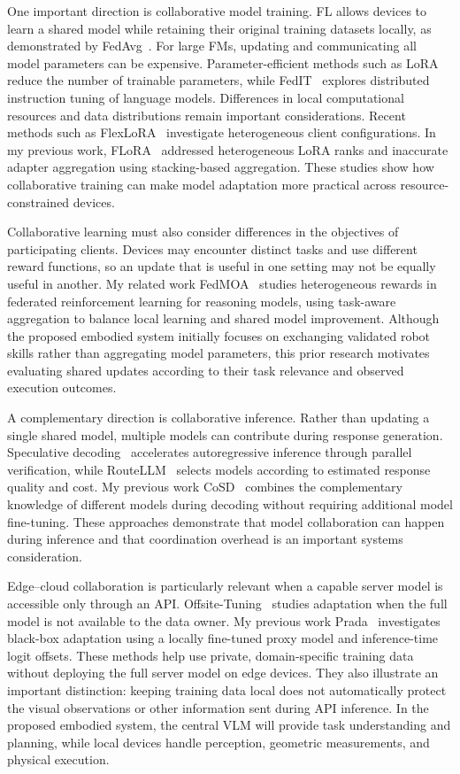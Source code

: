 \documentclass[11pt]{article}
\begin{document}
One important direction is collaborative model training. FL allows devices to learn a shared model while retaining their original training datasets locally, as demonstrated by FedAvg~\cite{mcmahan2017fedavg}. For large FMs, updating and communicating all model parameters can be expensive. Parameter-efficient methods such as LoRA~\cite{hu2022lora} reduce the number of trainable parameters, while FedIT~\cite{zhang2023fedit} explores distributed instruction tuning of language models. Differences in local computational resources and data distributions remain important considerations. Recent methods such as FlexLoRA~\cite{bai2024flexlora} investigate heterogeneous client configurations. In my previous work, FLoRA~\cite{flora2024} addressed heterogeneous LoRA ranks and inaccurate adapter aggregation using stacking-based aggregation. These studies show how collaborative training can make model adaptation more practical across resource-constrained devices.

Collaborative learning must also consider differences in the objectives of participating clients. Devices may encounter distinct tasks and use different reward functions, so an update that is useful in one setting may not be equally useful in another. My related work FedMOA~\cite{fedmoa2026} studies heterogeneous rewards in federated reinforcement learning for reasoning models, using task-aware aggregation to balance local learning and shared model improvement. Although the proposed embodied system initially focuses on exchanging validated robot skills rather than aggregating model parameters, this prior research motivates evaluating shared updates according to their task relevance and observed execution outcomes.

A complementary direction is collaborative inference. Rather than updating a single shared model, multiple models can contribute during response generation. Speculative decoding~\cite{leviathan2023speculative} accelerates autoregressive inference through parallel verification, while RouteLLM~\cite{ong2025routellm} selects models according to estimated response quality and cost. My previous work CoSD~\cite{cosd2025} combines the complementary knowledge of different models during decoding without requiring additional model fine-tuning. These approaches demonstrate that model collaboration can happen during inference and that coordination overhead is an important systems consideration.

Edge--cloud collaboration is particularly relevant when a capable server model is accessible only through an API. Offsite-Tuning~\cite{xiao2023offsite} studies adaptation when the full model is not available to the data owner. My previous work Prada~\cite{prada2025} investigates black-box adaptation using a locally fine-tuned proxy model and inference-time logit offsets. These methods help use private, domain-specific training data without deploying the full server model on edge devices. They also illustrate an important distinction: keeping training data local does not automatically protect the visual observations or other information sent during API inference. In the proposed embodied system, the central VLM will provide task understanding and planning, while local devices handle perception, geometric measurements, and physical execution.
\end{document}
